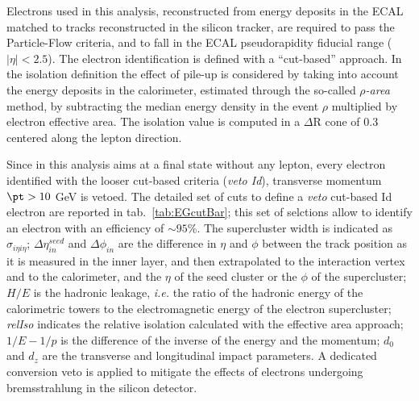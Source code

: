 Electrons used in this analysis, reconstructed from energy deposits in the ECAL matched to tracks reconstructed in the silicon tracker, are required to pass the Particle-Flow criteria, and to fall in the ECAL pseudorapidity fiducial range ($|\eta|<2.5$). The electron identification is defined with a ``cut-based'' approach. In the isolation definition the effect of pile-up is considered by taking into account the energy deposits in the calorimeter, estimated through the so-called \emph{$\rho$-area} method, by subtracting the median energy density in the event $\rho$ multiplied by electron effective area. The isolation value is computed in a $\Delta$R cone of 0.3 centered along the lepton direction.

\noindent Since in this analysis aims at a final state without any lepton, every electron identified with the looser cut-based criteria (\emph{veto Id}), transverse momentum $\pt > 10$ GeV is vetoed. The detailed set of cuts to define a \emph{veto} cut-based Id electron are reported in tab.~\ref{tab:EGcutBar}; this set of selctions allow to identify an electron with an efficiency of $\sim 95$\%. The supercluster width is indicated as $\sigma_{i\eta i\eta}$; $\Delta \eta_{in}^{seed}$ and $\Delta \phi_{in}$ are the difference in $\eta$ and $\phi$ between the track position as it is measured in the inner layer, and then extrapolated to the interaction vertex and to the calorimeter, and the $\eta$ of the seed cluster or the $\phi$ of the supercluster; $H/E$ is the hadronic leakage, \textit{i.e.} the ratio of the hadronic energy of the calorimetric towers to the electromagnetic energy of the electron supercluster; \emph{relIso} indicates the relative isolation calculated with the effective area approach; $1/E - 1/p$ is the difference of the inverse of the energy and the momentum; $d_0$ and $d_z$ are the transverse and longitudinal impact parameters. A dedicated conversion veto is applied to mitigate the effects of electrons undergoing bremsstrahlung in the silicon detector.

